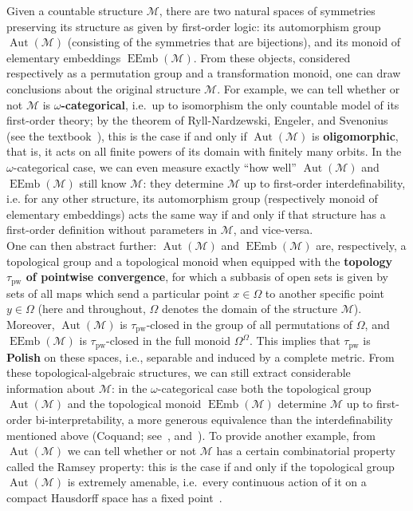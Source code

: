\documentclass{article}
\theoremstyle{remark}
\theoremstyle{definition}
\DeclareMathOperator{\Aut}{Aut}
\DeclareMathOperator{\EEmb}{EEmb}
\newcommand{\M}[0]{\mathcal{M}}
\newcommand{\pw}[0]{\tau_{\mathrm{pw}}}
\begin{document}
Given a countable structure $\M$, there are two natural spaces of symmetries preserving its structure as given by first-order logic: its automorphism group $\Aut(\M)$ 
{(consisting of the symmetries that are bijections), }%
and its monoid of elementary embeddings $\EEmb(\M)$.
From these objects, considered respectively as a permutation group and a transformation monoid, one can draw conclusions about the original structure $\M$. For example, we can tell whether or not $\M$ is \textbf{$\omega$-categorical}, i.e.~up to isomorphism the only countable model of its first-order theory; by the theorem of Ryll-Nardzewski, Engeler, and Svenonius (see the textbook~\cite{tent2012course}), this is the case if and only if $\Aut(\M)$ is \textbf{oligomorphic}, that is, it acts on all finite powers of its domain %
with finitely many orbits. 
 In the $\omega$-categorical case, we can even measure exactly ``how well'' $\Aut(\M)$ and $\EEmb(\M)$ still know $\M$: they determine $\M$ up to first-order interdefinability, i.e. for any other structure, its automorphism group (respectively monoid of elementary embeddings) acts the same way if and only if that structure has a first-order definition without parameters in $\M$, and vice-versa.\\

One can then abstract further: $\Aut(\M)$ and $\EEmb(\M)$ are, respectively, a topological group and a topological monoid when equipped with the \textbf{topology $\pw$ of pointwise convergence}, for which a subbasis of open sets is given by sets of all maps which send a particular point $x\in \Omega$ to another specific point $y\in \Omega$ (here and throughout, $\Omega$ denotes the domain of the structure $\M$).  Moreover, $\Aut(\M)$ is $\pw$-closed in the group of all permutations of $\Omega$, and $\EEmb(\M)$ is $\pw$-closed in the full monoid $\Omega^\Omega$. This implies that $\pw$ is \textbf{Polish}  on these spaces, i.e., separable and induced by a complete metric.
From these topological-algebraic structures, we can still extract considerable information about $\M$: in the $\omega$-categorical case both the topological group $\Aut(\M)$ and the topological monoid $\EEmb(\M)$ determine $\M$ up to first-order %
 {bi-interpretability,} a more generous equivalence than the interdefinability mentioned above
(Coquand; see~\cite{AhlbrandtZiegler}, and~\cite{Lascar}). %
 To provide another example, %
 from $\Aut(\M)$ we can tell whether or not $\M$ has a certain combinatorial property called the Ramsey property: this is the case if and only if the topological group $\Aut(\M)$ is extremely amenable, i.e.~every continuous action of it on a compact Hausdorff space has a fixed point~\cite{KPT}.\\
\end{document}
